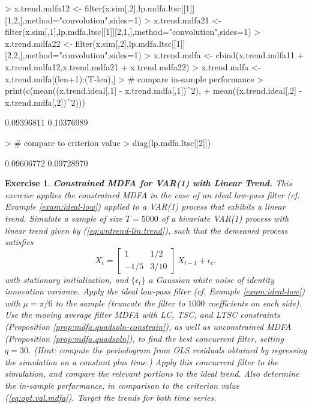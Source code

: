 \documentclass[a4paper]{book}
\newtheorem{Exercise}{Exercise}
\begin{document}
\begin{Schunk}
\begin{Sinput}
> x.trend.mdfa12 <- filter(x.sim[,2],lp.mdfa.ltsc[[1]][1,2,],method="convolution",sides=1)
> x.trend.mdfa21 <- filter(x.sim[,1],lp.mdfa.ltsc[[1]][2,1,],method="convolution",sides=1)
> x.trend.mdfa22 <- filter(x.sim[,2],lp.mdfa.ltsc[[1]][2,2,],method="convolution",sides=1)
> x.trend.mdfa <- cbind(x.trend.mdfa11 + x.trend.mdfa12,x.trend.mdfa21 + x.trend.mdfa22)
> x.trend.mdfa <- x.trend.mdfa[(len+1):(T-len),] 
> # compare in-sample performance
> print(c(mean((x.trend.ideal[,1] - x.trend.mdfa[,1])^2),
+ 	mean((x.trend.ideal[,2] - x.trend.mdfa[,2])^2)))
\end{Sinput}
\begin{Soutput}
[1] 0.09396811 0.10376989
\end{Soutput}
\begin{Sinput}
> # compare to criterion value
> diag(lp.mdfa.ltsc[[2]])
\end{Sinput}
\begin{Soutput}
[1] 0.09606772 0.09728970
\end{Soutput}
\end{Schunk}
 
 

\begin{Exercise} {\bf  Constrained MDFA for VAR(1) with Linear Trend.} \rm
\label{exer:var1trend-mdfa}
This exercise applies the constrained MDFA in the case of an ideal low-pass filter
 (cf. Example \ref{exam:ideal-low}) 
 applied to a VAR(1) process that exhibits a linear trend.
 Simulate a sample of size $T=5000$ of a
   bivariate VAR(1) process with linear trend  given by
   (\ref{eq:wntrend-lin.trend}), such that the demeaned process satisfies
\[
  X_t =  \left[ \begin{array}{cc}  1  & 1/2 \\    -1/5  &  3/10
    \end{array} \right] \, X_{t-1} + \epsilon_t,
\]
 with stationary initialization, and $\{ \epsilon_t \}$ a Gaussian white noise of identity innovation variance.   Apply the   ideal low-pass filter
  (cf. Example \ref{exam:ideal-low}) with 
  $\mu = \pi/6$ to the sample (truncate the filter to $1000$ coefficients on each side).  
 Use the moving average filter  MDFA  with LC, TSC, and LTSC constraints
  (Proposition \ref{prop:mdfa.quadsoln-constrain}),
  as well as unconstrained MDFA  (Proposition \ref{prop:mdfa.quadsoln}), to find the best
 concurrent filter, setting $q= 30$. 
  (Hint: compute the periodogram from OLS residuals obtained by regressing the simulation
   on a constant plus time.)
 Apply this concurrent filter 
 to the simulation, and compare the relevant portions to the ideal trend.
 Also determine the in-sample performance, in comparison to the criterion value
 (\ref{eq:opt.val.mdfa}).   Target the trends for both time series.
\end{Exercise}
\end{document}
